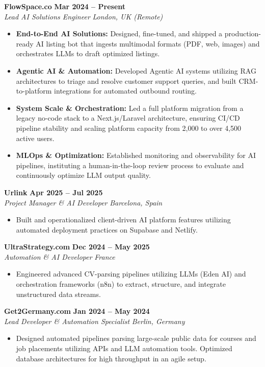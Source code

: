\documentclass[a4paper,10pt]{article}
\newcommand{\role}[4]{%
 \textbf{#1} \hfill \textbf{#2}\\[1pt]%
 \textit{#3} \hfill \textit{#4}\\[2pt]%
}
\begin{document}
\role{FlowSpace.co}{Mar 2024 -- Present}{Lead AI Solutions Engineer}{London, UK (Remote)}
\begin{itemize}
 \item \textbf{End-to-End AI Solutions:} Designed, fine-tuned, and shipped a production-ready AI listing bot that ingests multimodal formats (PDF, web, images) and orchestrates LLMs to draft optimized listings.
 \item \textbf{Agentic AI \& Automation:} Developed Agentic AI systems utilizing RAG architectures to triage and resolve customer support queries, and built CRM-to-platform integrations for automated outbound routing.
 \item \textbf{System Scale \& Orchestration:} Led a full platform migration from a legacy no-code stack to a Next.js/Laravel architecture, ensuring CI/CD pipeline stability and scaling platform capacity from 2,000 to over 4,500 active users.
 \item \textbf{MLOps \& Optimization:} Established monitoring and observability for AI pipelines, instituting a human-in-the-loop review process to evaluate and continuously optimize LLM output quality.
\end{itemize}

\role{Urlink}{Apr 2025 -- Jul 2025}{Project Manager \& AI Developer}{Barcelona, Spain}
\begin{itemize}
 \item Built and operationalized client-driven AI platform features utilizing automated deployment practices on Supabase and Netlify.
\end{itemize}

\role{UltraStrategy.com}{Dec 2024 -- May 2025}{Automation \& AI Developer}{France}
\begin{itemize}
 \item Engineered advanced CV-parsing pipelines utilizing LLMs (Eden AI) and orchestration frameworks (n8n) to extract, structure, and integrate unstructured data streams.
\end{itemize}

\role{Get2Germany.com}{Jan 2024 -- May 2024}{Lead Developer \& Automation Specialist}{Berlin, Germany}
\begin{itemize}
 \item Designed automated pipelines parsing large-scale public data for courses and job placements utilizing APIs and LLM automation tools. Optimized database architectures for high throughput in an agile setup.
\end{itemize}
\end{document}
